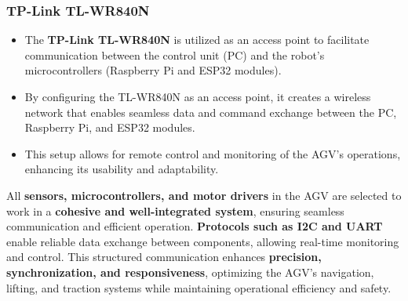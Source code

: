 \documentclass[../../main]{subfiles}
\begin{document}
\subsubsection{TP-Link TL-WR840N}
\begin{itemize}
    \item The \textbf{TP-Link TL-WR840N} is utilized as an access point 
    to facilitate communication between the control unit (PC) and the 
    robot's microcontrollers (Raspberry Pi and ESP32 modules).
    \item By configuring the TL-WR840N as an access point, it creates 
    a wireless network that enables seamless data and command exchange 
    between the PC, Raspberry Pi, and ESP32 modules.
    \item This setup allows for remote control and monitoring of the 
    AGV's operations, enhancing its usability and adaptability.
\end{itemize}

All \textbf{sensors, microcontrollers, and motor drivers} in the AGV 
are selected to work in a \textbf{cohesive and well-integrated system}, 
ensuring seamless communication and efficient operation. 
\textbf{Protocols such as I2C and UART} enable reliable data exchange 
between components, allowing real-time monitoring and control. 
This structured communication enhances \textbf{precision, synchronization, 
and responsiveness}, optimizing the AGV’s navigation, lifting, and 
traction systems while maintaining operational efficiency and safety.
    



  
  
  
\end{document}
